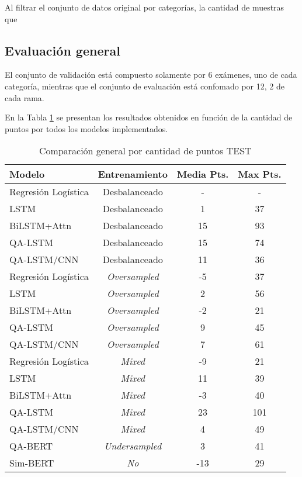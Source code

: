 Al filtrar el conjunto de datos original por categorías, la cantidad de muestras que 


\subsection{Evaluación general}

El conjunto de validación está compuesto solamente por 6 exámenes, uno de cada categoría, mientras que el conjunto de evaluación está confomado por 12, 2 de cada rama.

En la Tabla \ref{comparison_points_general} se presentan los resultados obtenidos en función de la cantidad de puntos por todos los modelos implementados. 

\begin{table}[!tb]
  \begin{center}
    \caption{Comparación general por cantidad de puntos TEST}
    \begin{tabular}{l|c|c|c}
      \textbf{Modelo} & \textbf{Entrenamiento} & \textbf{Media Pts.} & \textbf{Max Pts.}\\
      \hline
      Regresión Logística & Desbalanceado & - & - \\
      LSTM & Desbalanceado & 1 & 37 \\
      BiLSTM+Attn & Desbalanceado & 15 & 93 \\
      QA-LSTM & Desbalanceado & 15 & 74 \\
      QA-LSTM/CNN & Desbalanceado & 11 & 36 \\

      Regresión Logística & \textit{Oversampled} & -5 & 37 \\
      LSTM & \textit{Oversampled} & 2 & 56 \\
      BiLSTM+Attn & \textit{Oversampled} & -2 & 21 \\
      QA-LSTM & \textit{Oversampled} & 9 & 45 \\
      QA-LSTM/CNN & \textit{Oversampled} & 7 & 61 \\

      Regresión Logística & \textit{Mixed} & -9 & 21 \\
      LSTM & \textit{Mixed} & 11 & 39 \\
      BiLSTM+Attn & \textit{Mixed} & -3 & 40 \\
      QA-LSTM & \textit{Mixed} & 23 & 101 \\
      QA-LSTM/CNN & \textit{Mixed} & 4 & 49 \\

      QA-BERT & \textit{Undersampled} & 3 & 41 \\
      Sim-BERT & \textit{No} & -13 & 29 \\
    \end{tabular}
  \end{center}
  \label{comparison_points_general}
\end{table}


